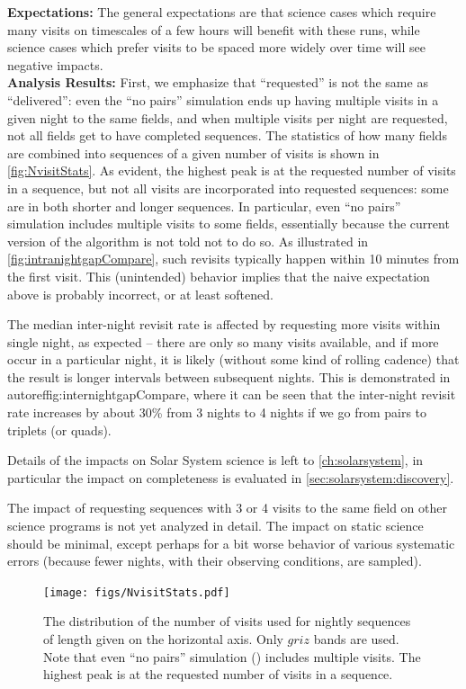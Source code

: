 {\bf Expectations:} The general expectations are that science cases
which require many visits on timescales of a few hours will benefit
with these runs, while science cases which prefer visits to be spaced
more widely over time will see negative impacts.\\

{\bf Analysis Results:}
First, we emphasize that ``requested'' is not the same as
``delivered'': even the ``no pairs''
simulation  ends
up having multiple visits in a given night to the same fields, and
when multiple visits per night are requested, not all fields get to
have completed sequences. The statistics of how many fields are
combined into sequences of a given number of visits is shown in
\autoref{fig:NvisitStats}.  As evident, the highest peak is at the
requested number of visits in a sequence, but not all visits are
incorporated into requested sequences: some are in both shorter and
longer sequences. In particular, even ``no pairs'' simulation includes
multiple visits to some fields, essentially because the current
version of the algorithm is not told not to do so. As illustrated in
\autoref{fig:intranightgapCompare}, such revisits typically happen
within 10 minutes from the first visit. This (unintended) behavior
implies that the naive expectation above is probably incorrect, or at
least softened.

The median inter-night revisit rate is affected by requesting more
visits within single night, as expected -- there are only so many
visits available, and if more occur in a particular night, it is
likely (without some kind of rolling cadence) that the result is
longer intervals between subsequent nights. This is demonstrated in
autoref{fig:internightgapCompare}, where it can be seen that the
inter-night revisit rate increases by about 30\% from 3 nights to 4
nights if we go from pairs to triplets (or quads).

Details of the impacts on Solar System science is
left to \autoref{ch:solarsystem}, in particular the impact on
completeness is evaluated in \autoref{sec:solarsystem:discovery}.

The impact of requesting sequences with 3 or 4 visits to the same
field on other science programs is not yet analyzed in detail.  The
impact on static science should be minimal, except perhaps for a bit
worse behavior of various systematic errors (because fewer nights,
with their observing conditions, are sampled).

\begin{figure}[t!]
\vskip -2.5in
\texttt{[image: figs/NvisitStats.pdf]}
\vskip -2.7in
\caption{The distribution of the number of visits used for nightly sequences of
length given on the horizontal axis. Only $griz$ bands are used. Note that even
``no pairs'' simulation ()
includes multiple visits. The highest peak is at the
requested number of visits in a sequence.}
\label{fig:NvisitStats}
\end{figure}

